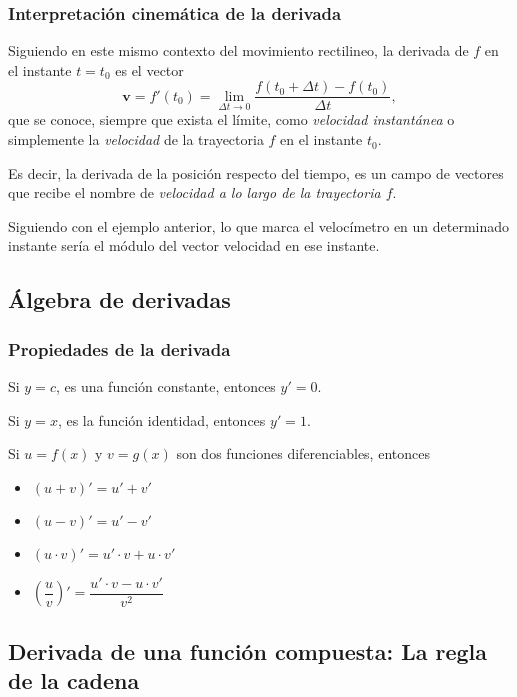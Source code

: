\begin{frame}
	\frametitle{Interpretación cinemática de la derivada}
	Siguiendo en este mismo contexto del movimiento rectilineo, la derivada de $f$ en el instante $t=t_0$ es el vector
	\[
		\mathbf{v}=f'(t_0)=\lim_{\Delta t\rightarrow 0}\frac{f(t_0+\Delta t)-f(t_0)}{\Delta t},
	\]
	que se conoce, siempre que exista el límite, como \emph{velocidad instantánea} o simplemente la \emph{velocidad} de la
	trayectoria $f$ en el instante $t_0$.
	
	Es decir, la derivada de la posición respecto del tiempo, es un campo de vectores que recibe el nombre de
	\emph{velocidad a lo largo de la trayectoria $f$}.
	
	Siguiendo con el ejemplo anterior, lo que marca el velocímetro en un determinado instante sería el módulo del vector
	velocidad  en ese instante.
\end{frame}



\subsection{Álgebra de derivadas}

\begin{frame}
	\frametitle{Propiedades de la derivada}
	Si $y=c$, es una función constante, entonces $y'=0$.
	
	Si $y=x$, es la función identidad, entonces  $y'=1$.
	
	Si $u=f(x)$ y $v=g(x)$ son dos funciones diferenciables, entonces
	\begin{itemize}
		\item $(u+v)'=u'+v'$
		\item $(u-v)'=u'-v'$
		\item $(u\cdot v)'=u'\cdot v+ u\cdot v'$
		\item $\left(\dfrac{u}{v}\right)'=\dfrac{u'\cdot v-u\cdot v'}{v^2}$
	\end{itemize}
\end{frame}


\subsection{Derivada de una función compuesta: La regla de la cadena}


